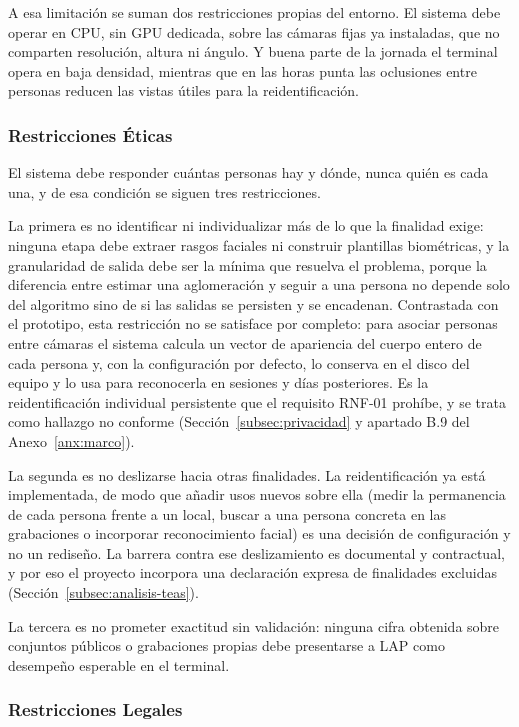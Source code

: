 A esa limitación se suman dos restricciones propias del entorno. El sistema debe operar en
CPU, sin GPU dedicada, sobre las cámaras fijas ya instaladas, que no comparten resolución,
altura ni ángulo. Y buena parte de la jornada el terminal opera en baja densidad, mientras que
en las horas punta las oclusiones entre personas reducen las vistas útiles para la
reidentificación.

\subsubsection{Restricciones Éticas}
\label{subsec:restricciones-eticas}

El sistema debe responder cuántas personas hay y dónde, nunca quién es cada una, y de esa
condición se siguen tres restricciones.

La primera es no identificar ni individualizar más de lo que la finalidad exige: ninguna etapa
debe extraer rasgos faciales ni construir plantillas biométricas, y la granularidad de salida debe
ser la mínima que resuelva el problema, porque la diferencia entre estimar una aglomeración y
seguir a una persona no depende solo del algoritmo sino de si las salidas se persisten y se
encadenan. Contrastada con el prototipo, esta restricción no se satisface por completo: para
asociar personas entre cámaras el sistema calcula un vector de apariencia del cuerpo entero de
cada persona y, con la configuración por defecto, lo conserva en el disco del equipo y lo usa
para reconocerla en sesiones y días posteriores. Es la reidentificación individual persistente que
el requisito RNF-01 prohíbe, y se trata como hallazgo no conforme
(Sección~\ref{subsec:privacidad} y apartado B.9 del Anexo~\ref{anx:marco}).

La segunda es no deslizarse hacia otras finalidades. La reidentificación ya está implementada,
de modo que añadir usos nuevos sobre ella (medir la permanencia de cada persona frente a un
local, buscar a una persona concreta en las grabaciones o incorporar reconocimiento facial) es
una decisión de configuración y no un rediseño. La barrera contra ese deslizamiento es
documental y contractual, y por eso el proyecto incorpora una declaración expresa de
finalidades excluidas (Sección~\ref{subsec:analisis-teas}).

La tercera es no prometer exactitud sin validación: ninguna cifra obtenida sobre conjuntos
públicos o grabaciones propias debe presentarse a LAP como desempeño esperable en el
terminal.

\subsubsection{Restricciones Legales}
\label{subsec:restricciones-legales}

